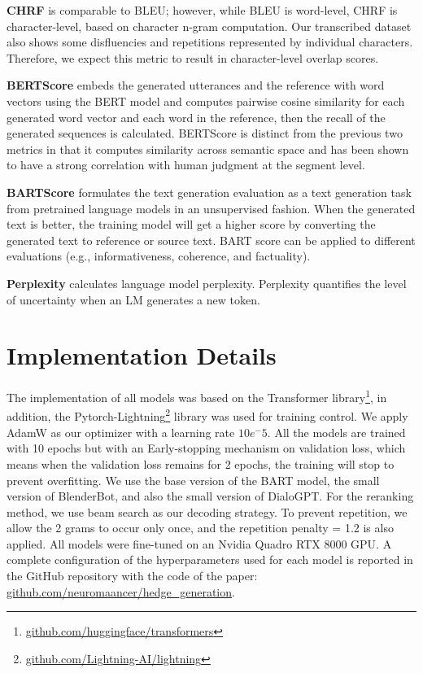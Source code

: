 \documentclass[11pt]{article}
\begin{document}
\textbf{CHRF} \citep{popovic2015chrf} is comparable to BLEU; however, while BLEU is word-level, CHRF is character-level, based on character n-gram computation. Our transcribed dataset also shows some disfluencies and repetitions represented by individual characters. Therefore, we expect this metric to result in character-level overlap scores.

\textbf{BERTScore} \citep{zhang2019bertscore} embeds the generated utterances and the reference with word vectors using the BERT model and computes pairwise cosine similarity for each generated word vector and each word in the reference, then the recall of the generated sequences is calculated. BERTScore is distinct from the previous two metrics in that it computes similarity across semantic space and has been shown to have a strong correlation with human judgment at the segment level.

\textbf{BARTScore} \citep{yuan2021bartscore} formulates the text generation evaluation as a text generation task from pretrained language models in an unsupervised fashion. When the generated text is better, the training model will get a higher score by converting the generated text to reference or source text. BART score can be applied to different evaluations (e.g., informativeness, coherence, and factuality).

\textbf{Perplexity} \citep{chen1998evaluation} calculates  language model perplexity. Perplexity quantifies the level of uncertainty when an LM generates a new token.

\section{Implementation Details}\label{appendix:imp_details}
The implementation of all models was based on the Transformer library\footnote{\url{github.com/huggingface/transformers}}, in addition, the Pytorch-Lightning\footnote{\url{github.com/Lightning-AI/lightning}} library was used for training control. We apply AdamW \citep{loshchilov2018decoupled} as our optimizer with a learning rate $10e^-5$. All the models are trained with 10 epochs but with an Early-stopping mechanism on validation loss, which means when the validation loss remains for 2 epochs, the training will stop to prevent overfitting.
We use the base version of the BART model, the small version of BlenderBot, and also the small version of DialoGPT. For the reranking method, we use beam search as our decoding strategy. To prevent repetition, we allow the 2 grams to occur only once, and the repetition penalty = 1.2 is also applied. All models were fine-tuned on an Nvidia Quadro RTX 8000 GPU. A complete configuration of the hyperparameters used for each model is reported in the GitHub repository with the code of the
paper: \url{github.com/neuromaancer/hedge_generation}.
\end{document}
